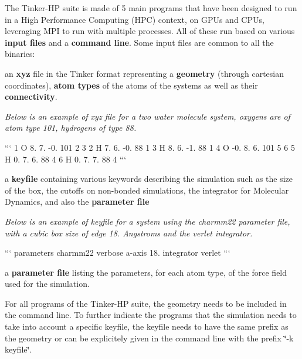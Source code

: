 The Tinker-\/\-H\-P suite is made of 5 main programs that have been designed to run in a High Performance Computing (H\-P\-C) context, on G\-P\-Us and C\-P\-Us, leveraging M\-P\-I to run with multiple processes. All of these run based on various {\bfseries input files} and a {\bfseries command line}. Some input files are common to all the binaries\-:
\begin{DoxyEnumerate}
\item an {\bfseries xyz} file in the Tinker format representing a {\bfseries geometry} (through cartesian coordinates), {\bfseries atom types} of the atoms of the systems as well as their {\bfseries connectivity}.
\end{DoxyEnumerate}

{\itshape Below is an example of xyz file for a two water molecule system, oxygens are of atom type 101, hydrogens of type 88.}

``` 1 O 8. 7. -\/0. 101 2 3 2 H 7. 6. -\/0. 88 1 3 H 8. 6. -\/1. 88 1 4 O -\/0. 8. 6. 101 5 6 5 H 0. 7. 6. 88 4 6 H 0. 7. 7. 88 4 ```


\begin{DoxyEnumerate}
\item a {\bfseries keyfile} containing various keywords describing the simulation such as the size of the box, the cutoffs on non-\/bonded simulations, the integrator for Molecular Dynamics, and also the {\bfseries parameter file}
\end{DoxyEnumerate}

{\itshape Below is an example of keyfile for a system using the charmm22 parameter file, with a cubic box size of edge 18. Angstroms and the verlet integrator.}

``` parameters charmm22 verbose a-\/axis 18. integrator verlet ```


\begin{DoxyEnumerate}
\item a {\bfseries parameter file} listing the parameters, for each atom type, of the force field used for the simulation.
\end{DoxyEnumerate}

For all programs of the Tinker-\/\-H\-P suite, the geometry needs to be included in the command line. To further indicate the programs that the simulation needs to take into account a specific keyfile, the keyfile needs to have the same prefix as the geometry or can be explicitely given in the command line with the prefix \char`\"{}-\/k keyfile\char`\"{}.

